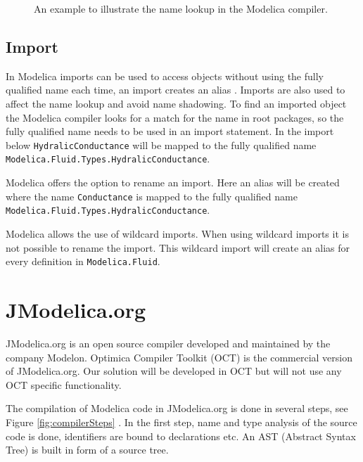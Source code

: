 \documentclass{cslthse-msc}
\begin{document}
\begin{figure}[!htbp]
    \centering
    
    \caption{An example to illustrate the name lookup in the Modelica compiler.}
    \label{fig:nameLookup}
\end{figure}

\subsection{Import}
In Modelica imports can be used to access objects without using the fully qualified name each time, an import creates an alias \cite{tillermodelica}. Imports are also used to affect the name lookup and avoid name shadowing. To find an imported object the Modelica compiler looks for a match for the name in root packages, so the fully qualified name needs to be used in an import statement. In the import below \texttt{HydralicConductance} will be mapped to the fully qualified name \texttt{Modelica.Fluid.Types.HydralicConductance}.



Modelica offers the option to rename an import. Here an alias will be created where the name \texttt{Conductance} is mapped to the fully qualified name \\\texttt{Modelica.Fluid.Types.HydralicConductance}.



Modelica allows the use of wildcard imports. When using wildcard imports it is not possible to rename the import. This wildcard import will create an alias for every definition in \texttt{Modelica.Fluid}.



\section{JModelica.org}
JModelica.org is an open source compiler developed and maintained by the company Modelon. Optimica Compiler Toolkit (OCT) is the commercial version of JModelica.org. Our solution will be developed in OCT but will not use any OCT specific functionality. 

The compilation of Modelica code in JModelica.org is done in several steps, see Figure \ref{fig:compilerSteps} \cite{aakesson2010implementation}. In the first step, name and type analysis of the source code is done, identifiers are bound to declarations etc. An AST (Abstract Syntax Tree) is built in form of a source tree.
\end{document}
